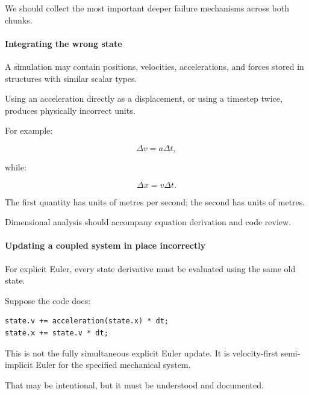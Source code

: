 \hypertarget{02-foundations-ii-ch022-production-numerical-behavior-what-can-break}{}

We should collect the most important deeper failure mechanisms across both chunks.

\paragraph{Integrating the wrong state}\label{02-foundations-ii-ch022-integrating-the-wrong-state}

\hypertarget{02-foundations-ii-ch022-integrating-the-wrong-state}{}

A simulation may contain positions, velocities, accelerations, and forces stored in structures with similar scalar types.

Using an acceleration directly as a displacement, or using a timestep twice, produces physically incorrect units.

For example:

\[
\Delta v=a\Delta t,
\]

while:

\[
\Delta x=v\Delta t.
\]

The first quantity has units of metres per second; the second has units of metres.

Dimensional analysis should accompany equation derivation and code review.

\paragraph{Updating a coupled system in place incorrectly}\label{02-foundations-ii-ch022-updating-a-coupled-system-in-place-incorrectly}

\hypertarget{02-foundations-ii-ch022-updating-a-coupled-system-in-place-incorrectly}{}

For explicit Euler, every state derivative must be evaluated using the same old state.

Suppose the code does:

\begin{verbatim}
state.v += acceleration(state.x) * dt;
state.x += state.v * dt;
\end{verbatim}

This is not the fully simultaneous explicit Euler update. It is velocity-first semi-implicit Euler for the specified mechanical system.

That may be intentional, but it must be understood and documented.

